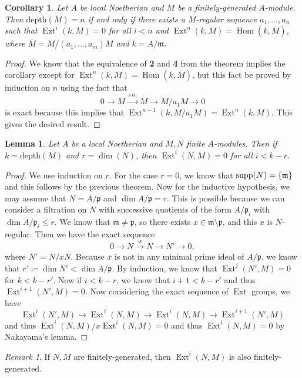 \documentclass[leqno, openany]{memoir}
\newtheorem{cor}[thm]{Corollary}
\newtheorem{lem}[thm]{Lemma}
\theoremstyle{definition}
\theoremstyle{remark}
\newtheorem{rmk}[thm]{Remark}
\theoremstyle{plain}
\theoremstyle{definition}
\theoremstyle{remark}
\newcommand{\mf}[1]{\mathfrak{#1}}
\newcommand{\mr}[1]{\mathrm{#1}}
\newcommand{\ol}[1]{\overline{#1}}
\DeclareMathOperator{\Hom}{Hom}
\DeclareMathOperator{\supp}{supp}
\DeclareMathOperator{\Ext}{Ext}
\begin{document}
\begin{cor}
    Let $A$ be local Noetherian and $M$ be a finitely-generated $A$-module. Then $\mr{depth}(M) = n$ if and only if there exists a $M$-regular sequence $a_1, \ldots, a_n$ such that $\Ext^i(k, M) = 0$ for all $i < n$ and $\Ext^n(k,M) = \Hom(k,\ol{M})$, where $\ol{M} = M/(a_1, \ldots, a_m)M$ and $k = A/\mf{m}$.
\end{cor}

\begin{proof}
    We know that the equivalence of \textbf{2} and \textbf{4} from the theorem implies the corollary except for $\Ext^n(k,M) = \Hom(k, \ol{M})$, but this fact be proved by induction on $n$ using the fact that
    \[ 0 \to M \xrightarrow{\times a_1} M \to M/a_1 M \to 0 \]
    is exact because this implies that $\Ext^{n-1}(k, M/a_1 M) = \Ext^n(k,M)$. This gives the desired result.
\end{proof}

\begin{lem}
    Let $A$ be a local Noetherian and $M,N$ finite $A$-modules. Then if $k = \mr{depth}(M)$ and $r = \dim(N)$, then $\Ext^i(N,M) = 0$ for all $i < k-r$.
\end{lem}

\begin{proof}
    We use induction on $r$. For the case $r = 0$, we know that $\supp(N) = \qty{\mf{m}}$ and this follows by the previous theorem. Now for the inductive hypothesis, we may assume that $N = A/\mf{p}$ and $\dim A/\mf{p} = r$. This is possible because we can consider a filtration on $N$ with successive quotients of the form $A/\mf{p}_i$ with $\dim A/\mf{p}_i \leq r$. We know that $\mf{m} \neq \mf{p}$, so there exists $x \in \mf{m} \setminus \mf{p}$, and this $x$ is $N$-regular. Then we have the exact sequence
    \[ 0 \to N \xrightarrow{\cdot x} N \to N' \to 0, \]
    where $N' = N/xN$. Because $\ol{x}$ is not in any minimal prime ideal of $A/\mf{p}$, we know that $r' \coloneqq \dim N' < \dim A/\mf{p}$. By induction, we know that $\Ext^j(N',M) = 0$ for $k < k-r'$. Now if $i < k-r$, we know that $i+1 < k-r'$ and thus $\Ext^{i+1}(N',M) = 0$. Now considering the exact sequence of $\Ext$ groups, we have
    \[ \Ext^i(N',M) \to \Ext^i(N,M) \to \Ext^i(N,M) \to \Ext^{i+1}(N',M) \]
    and thus $\Ext^i(N,M) / x \Ext^i(N,M) = 0$ and thus $\Ext^i(N,M) = 0$ by Nakayama's lemma.
\end{proof}

\begin{rmk}
    If $N,M$ are finitely-generated, then $\Ext^i(N,M)$ is also finitely-generated.
\end{rmk}
\end{document}

